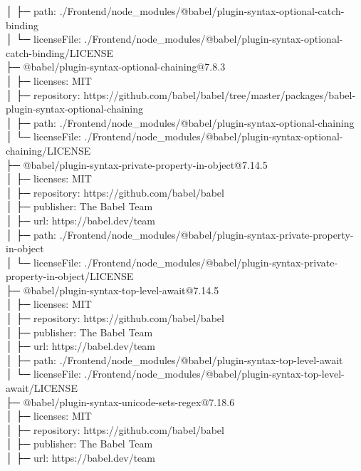 \documentclass[
    paper=a4,
    twoside=false,
    parskip=half,
    listof=entryprefix,
    listof=totoc,
    index=totoc,
    bibliography=totoc,
    headsepline,
]{scrbook}
\begin{document}
    │  ├─ path: ./Frontend/node\_modules/@babel/plugin-syntax-optional-catch-binding\\
    │  └─ licenseFile: ./Frontend/node\_modules/@babel/plugin-syntax-optional-catch-binding/LICENSE\\
    ├─ @babel/plugin-syntax-optional-chaining@7.8.3\\
    │  ├─ licenses: MIT\\
    │  ├─ repository: https://github.com/babel/babel/tree/master/packages/babel-plugin-syntax-optional-chaining\\
    │  ├─ path: ./Frontend/node\_modules/@babel/plugin-syntax-optional-chaining\\
    │  └─ licenseFile: ./Frontend/node\_modules/@babel/plugin-syntax-optional-chaining/LICENSE\\
    ├─ @babel/plugin-syntax-private-property-in-object@7.14.5\\
    │  ├─ licenses: MIT\\
    │  ├─ repository: https://github.com/babel/babel\\
    │  ├─ publisher: The Babel Team\\
    │  ├─ url: https://babel.dev/team\\
    │  ├─ path: ./Frontend/node\_modules/@babel/plugin-syntax-private-property-in-object\\
    │  └─ licenseFile: ./Frontend/node\_modules/@babel/plugin-syntax-private-property-in-object/LICENSE\\
    ├─ @babel/plugin-syntax-top-level-await@7.14.5\\
    │  ├─ licenses: MIT\\
    │  ├─ repository: https://github.com/babel/babel\\
    │  ├─ publisher: The Babel Team\\
    │  ├─ url: https://babel.dev/team\\
    │  ├─ path: ./Frontend/node\_modules/@babel/plugin-syntax-top-level-await\\
    │  └─ licenseFile: ./Frontend/node\_modules/@babel/plugin-syntax-top-level-await/LICENSE\\
    ├─ @babel/plugin-syntax-unicode-sets-regex@7.18.6\\
    │  ├─ licenses: MIT\\
    │  ├─ repository: https://github.com/babel/babel\\
    │  ├─ publisher: The Babel Team\\
    │  ├─ url: https://babel.dev/team\\
\end{document}
